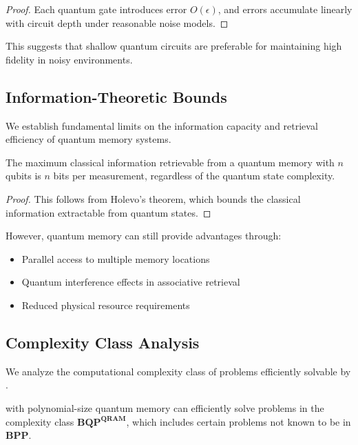 \begin{proof}
Each quantum gate introduces error $O(\epsilon)$, and errors accumulate linearly with circuit depth under reasonable noise models.
\end{proof}

This suggests that shallow quantum circuits are preferable for maintaining high fidelity in noisy environments.

\subsection{Information-Theoretic Bounds}

We establish fundamental limits on the information capacity and retrieval efficiency of quantum memory systems.

\begin{theorem}
\label{thm:info_bound}
The maximum classical information retrievable from a quantum memory with $n$ qubits is $n$ bits per measurement, regardless of the quantum state complexity.
\end{theorem}

\begin{proof}
This follows from Holevo's theorem, which bounds the classical information extractable from quantum states.
\end{proof}

However, quantum memory can still provide advantages through:
\begin{itemize}
    \item Parallel access to multiple memory locations
    \item Quantum interference effects in associative retrieval
    \item Reduced physical resource requirements
\end{itemize}

\subsection{Complexity Class Analysis}

We analyze the computational complexity class of problems efficiently solvable by \qmann.

\begin{theorem}
\label{thm:computational_power}
\qmann with polynomial-size quantum memory can efficiently solve problems in the complexity class $\mathbf{BQP}^{\mathbf{QRAM}}$, which includes certain problems not known to be in $\mathbf{BPP}$.
\end{theorem}


